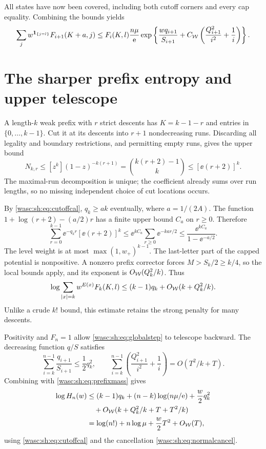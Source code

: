 \documentclass[11pt,a4paper]{article}
\theoremstyle{remark}\newtheorem{remark}[theorem]{Remark}
\newcommand{\ind}{\mathbf 1}\newcommand{\wasc}{\operatorname{wasc}}\newcommand{\dasc}{\operatorname{dasc}}
\numberwithin{equation}{section}
\begin{document}
All states have now been covered, including both cutoff corners and every cap equality. Combining the bounds yields
\begin{equation}\label{wasc:sh:eq:globalstep}
\sum_jw^{\ind_{\{j=l\}}}F_{i+1}(K+a,j)
\le F_i(K,l)\frac{n\mu}{\ee}
\exp\left\{\frac{wq_{i+1}}{S_{i+1}}+C_{\Wc}\left(\frac{Q_{i+1}^2}{i^2}+\frac1i\right)\right\}.
\end{equation}

\section{The sharper prefix entropy and upper telescope}\label{wasc:sh:sec:prefix}
A length-$k$ weak prefix with $r$ strict descents has $K=k-1-r$ and entries in $\{0,\ldots,k-1\}$. Cut it at its descents into $r+1$ nondecreasing runs. Discarding all legality and boundary restrictions, and permitting empty runs, gives the upper bound
\begin{equation}\label{wasc:sh:eq:prefixcount}
N_{k,r}\le[z^k](1-z)^{-k(r+1)}
=\binom{k(r+2)-1}{k}\le[\ee(r+2)]^k.
\end{equation}
The maximal-run decomposition is unique; the coefficient already sums over run lengths, so no missing independent choice of cut locations occurs.

By \eqref{wasc:sh:eq:cutoffcal}, $q_k\ge ak$ eventually, where $a=1/(2A)$. The function $1+\log(r+2)-(a/2)r$ has a finite upper bound $C_a$ on $r\ge0$. Therefore
\begin{equation}\label{wasc:sh:eq:runpenalty}
\sum_{r=0}^{k-1}\ee^{-q_kr}[\ee(r+2)]^k
\le\ee^{kC_a}\sum_{r\ge0}\ee^{-kar/2}
\le\frac{\ee^{kC_a}}{1-\ee^{-a/2}}.
\end{equation}
The level weight is at most $\max(1,w_+)^{k-1}$. The last-letter part of the capped potential is nonpositive. A nonzero prefix corrector forces $M>S_k/2\ge k/4$, so the local bounds apply, and its exponent is $O_{\mathcal W}(Q_k^2/k)$. Thus
\begin{equation}\label{wasc:sh:eq:prefixmass}
\log\sum_{|x|=k}w^{E(x)}F_k(K,l)
\le(k-1)q_k+O_{\mathcal W}(k+Q_k^2/k).
\end{equation}
Unlike a crude $k!$ bound, this estimate retains the strong penalty for many descents.

Positivity and $F_n=1$ allow \eqref{wasc:sh:eq:globalstep} to telescope backward. The decreasing function $q/S$ satisfies
\[
\sum_{i=k}^{n-1}\frac{q_{i+1}}{S_{i+1}}\le\frac12q_k^2,
\qquad
\sum_{i=k}^{n-1}\left(\frac{Q_{i+1}^2}{i^2}+\frac1i\right)=O(T^2/k+T).
\]
Combining with \eqref{wasc:sh:eq:prefixmass} gives
\begin{align}\label{wasc:sh:eq:upperfinish}
\log H_n(w)&\le(k-1)q_k+(n-k)\log(n\mu/\mathrm e)+\frac w2q_k^2\notag\\
&\quad+O_{\mathcal W}(k+Q_k^2/k+T+T^2/k)\notag\\
&=\log(n!)+n\log\mu+\frac w2T^2+O_{\mathcal W}(T),
\end{align}
using \eqref{wasc:sh:eq:cutoffcal} and the cancellation \eqref{wasc:sh:eq:normalcancel}.
\end{document}
